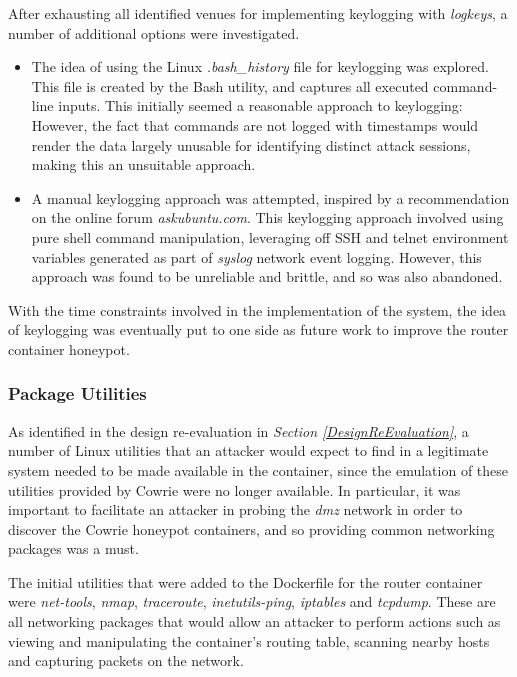  After exhausting all identified venues for implementing keylogging with \textit{logkeys}, a number of additional options were investigated.
 
 \begin{itemize}
 \item The idea of using the Linux \textit{.bash\_history} file for keylogging was explored. This file is created by the Bash utility, and captures all executed command-line inputs. This initially seemed a reasonable approach to keylogging: However, the fact that commands are not logged with timestamps would render the data largely unusable for identifying distinct attack sessions, making this an unsuitable approach.
 \item A manual keylogging approach was attempted, inspired by a recommendation on the online forum \textit{askubuntu.com}. \cite{ManualKeyloggingAskUbuntu} This keylogging approach involved using pure shell command manipulation, leveraging off SSH and telnet environment variables generated as part of \textit{syslog} network event logging. However, this approach was found to be unreliable and brittle, and so was also abandoned.
\end{itemize}
 
With the time constraints involved in the implementation of the system, the idea of keylogging was eventually put to one side as future work to improve the router container honeypot. 
     
\subsubsection{Package Utilities}
As identified in the design re-evaluation in \textit{Section \ref{DesignReEvaluation}}, a number of Linux utilities that an attacker would expect to find in a legitimate system needed to be made available  in the container, since the emulation of these utilities provided by Cowrie were no longer available. In particular, it was important to facilitate an attacker in probing the \textit{dmz} network in order to discover the Cowrie honeypot containers, and so providing common networking packages was a must.

The initial utilities that were added to the Dockerfile for the router container were \textit{net-tools}, \textit{nmap}, \textit{traceroute}, \textit{inetutils-ping}, \textit{iptables }and \textit{tcpdump}. These are all networking packages that would allow an attacker to perform actions such as viewing and manipulating the container's routing table, scanning nearby hosts and capturing packets on the network. 
   
